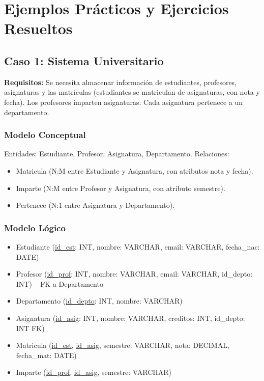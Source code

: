 \documentclass[12pt,a4paper,openany,oneside]{book}
\begin{document}
\chapter{Ejemplos Prácticos y Ejercicios Resueltos}

\section{Caso 1: Sistema Universitario}
\textbf{Requisitos:} Se necesita almacenar información de estudiantes, profesores, asignaturas y las matrículas (estudiantes se matriculan de asignaturas, con nota y fecha). Los profesores imparten asignaturas. Cada asignatura pertenece a un departamento.

\subsection{Modelo Conceptual}
Entidades: Estudiante, Profesor, Asignatura, Departamento.
Relaciones: 
\begin{itemize}
    \item Matricula (N:M entre Estudiante y Asignatura, con atributos nota y fecha).
    \item Imparte (N:M entre Profesor y Asignatura, con atributo semestre).
    \item Pertenece (N:1 entre Asignatura y Departamento).
\end{itemize}

\subsection{Modelo Lógico}
\begin{itemize}
    \item Estudiante (\underline{id\_est}: INT, nombre: VARCHAR, email: VARCHAR, fecha\_nac: DATE)
    \item Profesor (\underline{id\_prof}: INT, nombre: VARCHAR, email: VARCHAR, id\_depto: INT) -- FK a Departamento
    \item Departamento (\underline{id\_depto}: INT, nombre: VARCHAR)
    \item Asignatura (\underline{id\_asig}: INT, nombre: VARCHAR, creditos: INT, id\_depto: INT FK)
    \item Matricula (\underline{id\_est}, \underline{id\_asig}, semestre: VARCHAR, nota: DECIMAL, fecha\_mat: DATE)
    \item Imparte (\underline{id\_prof}, \underline{id\_asig}, semestre: VARCHAR)
\end{itemize}
\end{document}
